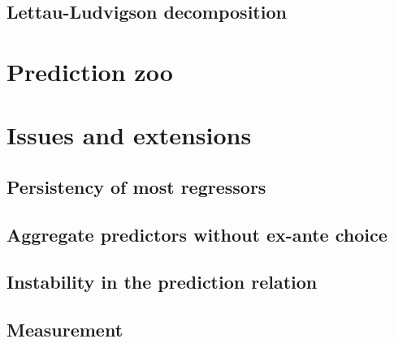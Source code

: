 \subsection{Lettau-Ludvigson decomposition}\label{chap1:sec4:ssec2}

\section{Prediction zoo}\label{chap1:sec5}

\section{Issues and extensions}\label{chap1:sec6}
\subsection{Persistency of most regressors}\label{chap1:sec6:ssec1}
\subsection{Aggregate predictors without ex-ante choice}\label{chap1:sec6:ssec2}
\subsection{Instability in the prediction relation}\label{chap1:sec6:ssec3}
\subsection{Measurement}\label{chap1:sec6:ssec4}